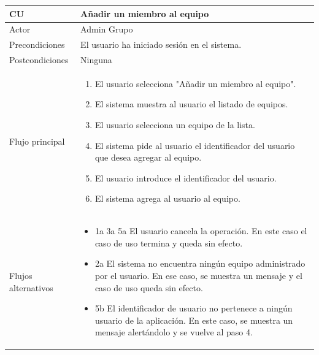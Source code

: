 \documentclass[twoside]{report}
\newcommand\addrow[2]{#1 &#2\\ }
\newcommand\addheading[2]{#1 &#2\\ \hline}
\newcommand\tabularhead{\begin{tabular}{lp{0.7\textwidth}}
\hline
}
\newcommand\addmulrow[2]{ \begin{minipage}[t][][t]{2.5cm}#1\end{minipage}%
   &\begin{minipage}[t][][t]{8cm}
    \begin{enumerate} #2   \end{enumerate}
    \end{minipage}\\ }
\newenvironment{usecase}{\tabularhead}
{\hline\end{tabular}}
\begin{document}
\begin{usecase}
  \addheading{\textbf{CU\arabic{usecase}}}{Añadir un miembro al equipo} 
  \addrow{Actor}{Admin Grupo}
  \addrow{Precondiciones}{El usuario ha iniciado sesión en el sistema.}
  \addrow{Postcondiciones}{Ninguna}
  \addmulrow{Flujo principal}{
  		\item El usuario selecciona "Añadir un miembro al equipo". %
        \item El sistema muestra al usuario el listado de equipos. %
        \item El usuario selecciona un equipo de la lista. %
        \item El sistema pide al usuario el identificador del usuario que desea agregar al equipo. %
        \item El usuario introduce el identificador del usuario. %
        \item El sistema agrega al usuario al equipo. %
  }
  \addrow{Flujos alternativos}{
  		\begin{itemize}
  		\item 1a 3a 5a El usuario cancela la operación. En este caso el caso de uso termina y queda sin efecto.
  		\item 2a El sistema no encuentra ningún equipo administrado por el usuario. En ese caso, se muestra un mensaje y el caso de uso queda sin efecto.
  		\item 5b El identificador de usuario no pertenece a ningún usuario de la aplicación. En este caso, se muestra un mensaje alertándolo y se vuelve al paso 4.
  		\end{itemize}
  }
\end{usecase}\\
\end{document}
